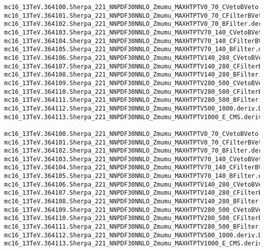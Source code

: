 \begin{tiny}
\begin{verbatim}
mc16_13TeV.364100.Sherpa_221_NNPDF30NNLO_Zmumu_MAXHTPTV0_70_CVetoBVeto.deriv.DAOD_STDM7.e5271_s3126_r9364_p3712
mc16_13TeV.364101.Sherpa_221_NNPDF30NNLO_Zmumu_MAXHTPTV0_70_CFilterBVeto.deriv.DAOD_STDM7.e5271_s3126_r9364_p3712
mc16_13TeV.364102.Sherpa_221_NNPDF30NNLO_Zmumu_MAXHTPTV0_70_BFilter.deriv.DAOD_STDM7.e5271_s3126_r9364_p3712
mc16_13TeV.364103.Sherpa_221_NNPDF30NNLO_Zmumu_MAXHTPTV70_140_CVetoBVeto.deriv.DAOD_STDM7.e5271_s3126_r9364_p3712
mc16_13TeV.364104.Sherpa_221_NNPDF30NNLO_Zmumu_MAXHTPTV70_140_CFilterBVeto.deriv.DAOD_STDM7.e5271_s3126_r9364_p3712
mc16_13TeV.364105.Sherpa_221_NNPDF30NNLO_Zmumu_MAXHTPTV70_140_BFilter.deriv.DAOD_STDM7.e5271_s3126_r9364_p3712
mc16_13TeV.364106.Sherpa_221_NNPDF30NNLO_Zmumu_MAXHTPTV140_280_CVetoBVeto.deriv.DAOD_STDM7.e5271_s3126_r9364_p3712
mc16_13TeV.364107.Sherpa_221_NNPDF30NNLO_Zmumu_MAXHTPTV140_280_CFilterBVeto.deriv.DAOD_STDM7.e5271_s3126_r9364_p3712
mc16_13TeV.364108.Sherpa_221_NNPDF30NNLO_Zmumu_MAXHTPTV140_280_BFilter.deriv.DAOD_STDM7.e5271_s3126_r9364_p3712
mc16_13TeV.364109.Sherpa_221_NNPDF30NNLO_Zmumu_MAXHTPTV280_500_CVetoBVeto.deriv.DAOD_STDM7.e5271_s3126_r9364_p3712
mc16_13TeV.364110.Sherpa_221_NNPDF30NNLO_Zmumu_MAXHTPTV280_500_CFilterBVeto.deriv.DAOD_STDM7.e5271_s3126_r9364_p3712
mc16_13TeV.364111.Sherpa_221_NNPDF30NNLO_Zmumu_MAXHTPTV280_500_BFilter.deriv.DAOD_STDM7.e5271_s3126_r9364_p3712
mc16_13TeV.364112.Sherpa_221_NNPDF30NNLO_Zmumu_MAXHTPTV500_1000.deriv.DAOD_STDM7.e5271_s3126_r9364_p3712
mc16_13TeV.364113.Sherpa_221_NNPDF30NNLO_Zmumu_MAXHTPTV1000_E_CMS.deriv.DAOD_STDM7.e5271_s3126_r9364_p3712

mc16_13TeV.364100.Sherpa_221_NNPDF30NNLO_Zmumu_MAXHTPTV0_70_CVetoBVeto.deriv.DAOD_STDM7.e5271_s3126_r10201_p3712
mc16_13TeV.364101.Sherpa_221_NNPDF30NNLO_Zmumu_MAXHTPTV0_70_CFilterBVeto.deriv.DAOD_STDM7.e5271_s3126_r10201_p3712
mc16_13TeV.364102.Sherpa_221_NNPDF30NNLO_Zmumu_MAXHTPTV0_70_BFilter.deriv.DAOD_STDM7.e5271_s3126_r10201_p3712
mc16_13TeV.364103.Sherpa_221_NNPDF30NNLO_Zmumu_MAXHTPTV70_140_CVetoBVeto.deriv.DAOD_STDM7.e5271_s3126_r10201_p3712
mc16_13TeV.364104.Sherpa_221_NNPDF30NNLO_Zmumu_MAXHTPTV70_140_CFilterBVeto.deriv.DAOD_STDM7.e5271_s3126_r10201_p3712
mc16_13TeV.364105.Sherpa_221_NNPDF30NNLO_Zmumu_MAXHTPTV70_140_BFilter.deriv.DAOD_STDM7.e5271_s3126_r10201_p3712
mc16_13TeV.364106.Sherpa_221_NNPDF30NNLO_Zmumu_MAXHTPTV140_280_CVetoBVeto.deriv.DAOD_STDM7.e5271_s3126_r10201_p3712
mc16_13TeV.364107.Sherpa_221_NNPDF30NNLO_Zmumu_MAXHTPTV140_280_CFilterBVeto.deriv.DAOD_STDM7.e5271_s3126_r10201_p3712
mc16_13TeV.364108.Sherpa_221_NNPDF30NNLO_Zmumu_MAXHTPTV140_280_BFilter.deriv.DAOD_STDM7.e5271_s3126_r10201_p3712
mc16_13TeV.364109.Sherpa_221_NNPDF30NNLO_Zmumu_MAXHTPTV280_500_CVetoBVeto.deriv.DAOD_STDM7.e5271_s3126_r10201_p3712
mc16_13TeV.364110.Sherpa_221_NNPDF30NNLO_Zmumu_MAXHTPTV280_500_CFilterBVeto.deriv.DAOD_STDM7.e5271_s3126_r10201_p3712
mc16_13TeV.364111.Sherpa_221_NNPDF30NNLO_Zmumu_MAXHTPTV280_500_BFilter.deriv.DAOD_STDM7.e5271_s3126_r10201_p3712
mc16_13TeV.364112.Sherpa_221_NNPDF30NNLO_Zmumu_MAXHTPTV500_1000.deriv.DAOD_STDM7.e5271_s3126_r10201_p3712
mc16_13TeV.364113.Sherpa_221_NNPDF30NNLO_Zmumu_MAXHTPTV1000_E_CMS.deriv.DAOD_STDM7.e5271_s3126_r10201_p3712


\end{verbatim}
\end{tiny}
